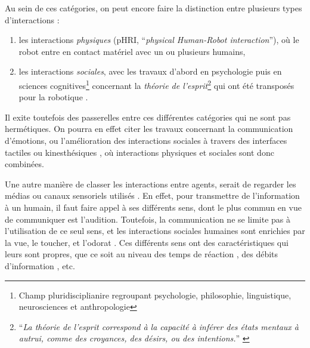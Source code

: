 Au sein de ces catégories, on peut encore faire la distinction entre plusieurs types d'interactions :
\begin{enumerate}[label=\alph*)]
	\item les interactions \emph{physiques} (pHRI, \foreignquote{french}{\textit{physical Human-Robot interaction}}), où le robot entre en contact matériel avec un ou plusieurs humains,
	\item les interactions \emph{sociales}, avec les travaux d'abord en psychologie \parencite{dearborn_review_1909} puis en sciences cognitives\footnote{\label{footnote_cognitive} Champ pluridisciplianire regroupant psychologie, philosophie, linguistique, neurosciences et anthropologie} concernant la \emph{théorie de l'esprit}\footnote{\label{footnote_TOM} \foreignquote{french}{\textit{La théorie de l’esprit correspond à la capacité à inférer des états mentaux à autrui, comme des croyances, des désirs, ou des intentions.}} \parencite{duval_theorie_2011}} \parencite{baron-cohen_evolution_2000} qui ont été transposés pour la robotique \parencite{scassellati_theory_2002}.
\end{enumerate}

Il exite toutefois des passerelles entre ces différentes catégories qui ne sont pas hermétiques. On pourra en effet citer les travaux concernant la communication d'émotions, ou l'amélioration des interactions sociales à travers des interfaces tactiles ou kinesthésiques \parencite{bailenson_virtual_2007, tsetserukou_affective_2009, teyssier_conveying_2020}, où interactions physiques et sociales sont donc combinées.

Une autre manière de classer les interactions entre agents, serait de regarder les médias ou canaux sensoriels utilisés \parencite{ajoudani_progress_2018}. En effet, pour transmettre de l'information à un humain, il faut faire appel à ses différents sens, dont le plus commun en vue de communiquer est l'audition. Toutefois, la communication ne se limite pas à l'utilisation de ce seul sens, et les interactions sociales humaines sont enrichies par la vue, le toucher, et l'odorat \parencite[Chapitre~1]{cherry_human_1978}. Ces différents sens ont des caractéristiques qui leurs sont propres, que ce soit au niveau des temps de réaction \parencite{chan_finger_2012, jain_comparative_2015}, des débits d'information \parencite{kondo_auditory_2017}, etc.


